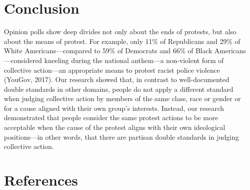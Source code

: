 \documentclass[12pt, letterpaper]{article}
\newcommand{\refsection}{\newpage \section{References}}
\begin{document}
\hypertarget{conclusion}{%
\section{Conclusion}\label{conclusion}}

Opinion polls show deep divides not only about the ends of protests, but
also about the means of protest. For example, only 11\% of Republicans
and 29\% of White Americans---compared to 59\% of Democrats and 66\% of
Black Americans---considered kneeling during the national anthem---a
non-violent form of collective action---an appropriate means to protest
racist police violence (YouGov, 2017). Our research showed that, in
contrast to well-documented double standards in other domains, people do
not apply a different standard when judging collective action by members
of the same class, race or gender or for a cause aligned with their own
group's interests. Instead, our research demonstrated that people
consider the same protest actions to be more acceptable when the cause
of the protest aligns with their own ideological positions---in other
words, that there are partisan double standards in judging collective
action.

\refsection

\begingroup

\noindent \setlength{\parindent}{-0.5in} \setlength{\leftskip}{0.5in}
\small
\end{document}
